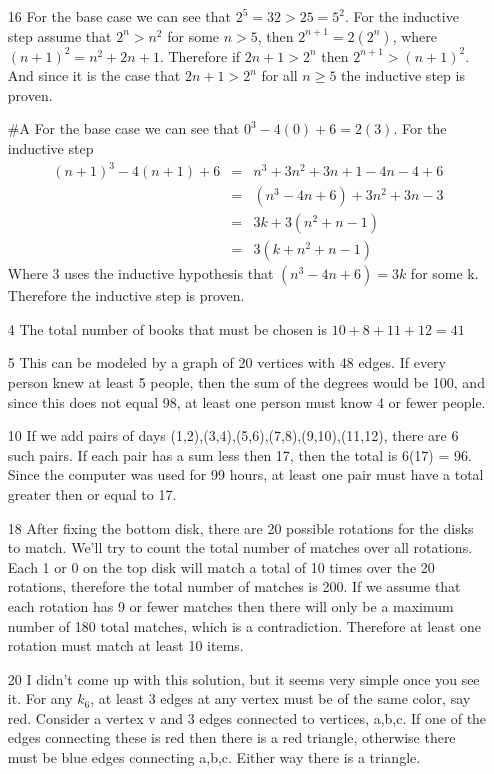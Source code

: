 \documentclass{article}
\begin{document}
\begin{enumerate}
  \item[16]
  For the base case we can see that $2^5=32 > 25 = 5^2$. For the inductive step
  assume that $2^n>n^2$ for some $n>5$, then $2^{n+1} = 2(2^n)$, where $(n+1)^2
  = n^2+2n+1$. Therefore if $2n+1>2^n$ then $2^{n+1}>(n+1)^2$. And since it is
  the case that $2n+1>2^n$ for all $n\geq 5$ the inductive step is proven. 
  \item[\#A]
  For the base case we can see that $0^3-4(0)+6 = 2(3)$. For the inductive step 
  \begin{eqnarray}
  (n+1)^3-4(n+1)+6 &=& n^3+3n^2+3n+1 - 4n - 4 + 6 \\
  &=& (n^3-4n+6) + 3n^2+3n-3 \\
  &=& 3k + 3(n^2+n-1) \\
  &=& 3(k+n^2+n-1)  
  \end{eqnarray}
  Where 3 uses the inductive hypothesis that $(n^3-4n+6) = 3k$ for some k.
  Therefore the inductive step is proven. 
  \item[4]
  The total number of books that must be chosen is $10+8+11+12=41$
  \item[5]
  This can be modeled by a graph of 20 vertices with 48 edges. If every person
  knew at least 5 people, then the sum of the degrees would be 100, and since
  this does not equal 98, at least one person must know 4 or fewer people. 
  \item[10]
  If we add pairs of days (1,2),(3,4),(5,6),(7,8),(9,10),(11,12), there are 6
  such pairs. If each pair has a sum less then 17, then the total is 6(17) = 96.
  Since the computer was used for 99 hours, at least one pair must have a total
  greater then or equal to 17. 
  \item[18]
  After fixing the bottom disk, there are 20 possible rotations for the disks to
  match. We'll try to count the total number of matches over all rotations. 
  Each 1 or 0 on the top disk will match a total of 10 times over the 20
  rotations,  therefore the total number of matches is 200. If we assume that 
  each rotation has 9 or fewer matches then there will only be a maximum number
  of 180 total matches, which is a contradiction. Therefore at least one
  rotation  must match at least 10 items.
  \item[20]
  I didn't come up with this solution, but it seems very simple once you see
  it. For any $k_6$, at least 3 edges at any vertex must be of the same color,
  say red. Consider a vertex v and 3 edges connected to vertices, a,b,c. If one
  of the edges connecting these is red then there is a red triangle, otherwise
  there must be blue edges connecting a,b,c. Either way there is a triangle. 
\end{enumerate}
\end{document}
